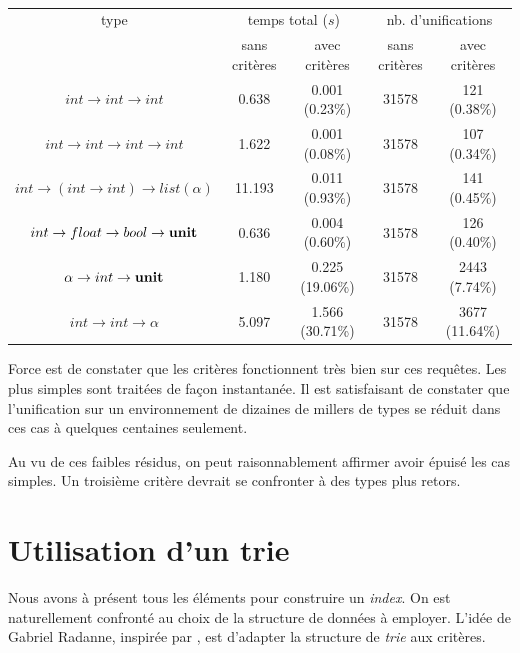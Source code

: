 \documentclass[a4paper]{report}
\theoremstyle{definition}
\begin{document}
\begin{table}[h]
  \centering
  \begin{tabular}{|*{5}{c|}}
    \hline
      type &
      \multicolumn{2}{c|}{temps total ($s$)} &
      \multicolumn{2}{c|}{nb. d'unifications}
    \\
    \cline{2-5}
      &
      sans critères & avec critères &
      sans critères & avec critères
    \\
    \hline
      $int \rightarrow int \rightarrow int$ &
      0.638 & 0.001 (0.23\%) &
      31578 & 121 (0.38\%)
    \\
      $int \rightarrow int \rightarrow int \rightarrow int$ &
      1.622 & 0.001 (0.08\%) &
      31578 & 107 (0.34\%)
    \\
      $int \rightarrow (int \rightarrow int) \rightarrow list (\alpha)$ &
      11.193 & 0.011 (0.93\%) &
      31578 & 141 (0.45\%)
    \\
      $int \rightarrow float \rightarrow bool \rightarrow \bold{unit}$ &
      0.636 & 0.004 (0.60\%) &
      31578 & 126 (0.40\%)
    \\
      $\alpha \rightarrow int \rightarrow \bold{unit}$ &
      1.180 & 0.225 (19.06\%) &
      31578 & 2443 (7.74\%)
    \\
      $int \rightarrow int \rightarrow \alpha$ &
      5.097 & 1.566 (30.71\%) &
      31578 & 3677 (11.64\%)
    \\
    \hline
  \end{tabular}
  \caption{\label{tab_apport2}}
\end{table}

Force est de constater que les critères fonctionnent très bien sur ces requêtes. Les plus simples sont traitées de façon instantanée. Il est satisfaisant de constater que l'unification sur un environnement de dizaines de millers de types se réduit dans ces cas à quelques centaines seulement.

Au vu de ces faibles résidus, on peut raisonnablement affirmer avoir épuisé les cas simples. Un troisième critère devrait se confronter à des types plus retors.


\section{Utilisation d'un trie}

Nous avons à présent tous les éléments pour construire un \emph{index}. On est naturellement confronté au choix de la structure de données à employer. L'idée de Gabriel Radanne, inspirée par \cite{Schulz}, est d'adapter la structure de \emph{trie} aux critères.
\end{document}
